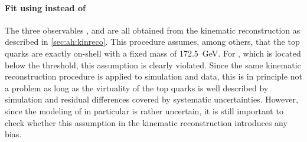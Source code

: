 \paragraph{Fit using \mbbll instead of \mtt}
The three observables \mtt, \chel and \chan are all obtained from the kinematic reconstruction as described in \cref{sec:ah:kinreco}. This procedure assumes, among others, that the top quarks are exactly on-shell with a fixed mass of \SI{172.5}{\GeV}. For \etat, which is located below the \ttbar threshold, this assumption is clearly violated. Since the same kinematic reconstruction procedure is applied to simulation and data, this is in principle not a problem as long as the virtuality of the top quarks is well described by simulation and residual differences covered by systematic uncertainties. However, since the modeling of \etat in particular is rather uncertain, it is still important to check whether this assumption in the kinematic reconstruction introduces any bias.

